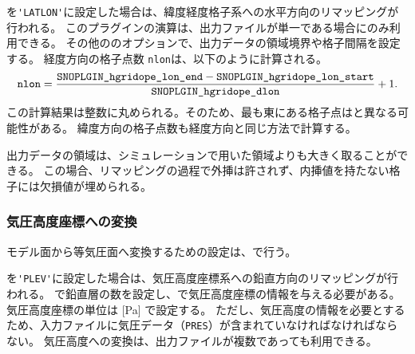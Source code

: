 を\verb|'LATLON'|に設定した場合は、緯度経度格子系への水平方向のリマッピングが行われる。
このプラグインの演算は、出力ファイルが単一である場合にのみ利用できる。
その他ののオプションで、出力データの領域境界や格子間隔を設定する。
経度方向の格子点数 \verb|nlon|は、以下のように計算される。
\begin{eqnarray}
  \nmitemeq{nlon} = \frac{\nmitemeq{SNOPLGIN_hgridope_lon_end} - \nmitemeq{SNOPLGIN_hgridope_lon_start} }{\nmitemeq{SNOPLGIN_hgridope_dlon}} + 1\nonumber.
\end{eqnarray}
\noindent
この計算結果は整数に丸められる。そのため、最も東にある格子点はと異なる可能性がある。
緯度方向の格子点数も経度方向と同じ方法で計算する。

出力データの領域は、シミュレーションで用いた領域よりも大きく取ることができる。
この場合、リマッピングの過程で外挿は許されず、内挿値を持たない格子には欠損値が埋められる。


\subsubsection{気圧高度座標への変換}

モデル面から等気圧面へ変換するための設定は、で行う。
%

を\verb|'PLEV'|に設定した場合は、気圧高度座標系への鉛直方向のリマッピングが行われる。
で鉛直層の数を設定し、で気圧高度座標の情報を与える必要がある。
気圧高度座標の単位は [Pa] で設定する。
ただし、気圧高度の情報を必要とするため、入力ファイルに気圧データ（\verb|PRES|）が含まれていなければなければならない。
気圧高度への変換は、出力ファイルが複数であっても利用できる。
